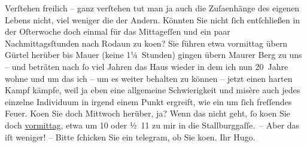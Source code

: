 \begin{ledgroupsized}[t]{13cm}
           \pstart
           Verſtehen freilich – ganz verſtehen tut man ja auch die Zuſa{\geminationm}enhänge des eigenen Lebens nicht, viel weniger die der
               Andern.\pend
           \pstart
           Könnten Sie nicht ſich entſchließen in der Oſterwoche doch einmal für
               das Mittageſſen und ein paar Nachmittagsſtunden nach Rodaun zu ko{\geminationm}en? {\pb}Sie führen etwa vormittag übern
                  Gürtel herüber bis Mauer (keine 1¼ Stunden) gingen übern Maurer Berg zu uns – und beträten nach ſo viel Jahren das Haus wieder in dem ich nun
               20 Jahre wohne und um das ich – um es weiter behalten zu können – jetzt einen harten
               Kampf kämpfe, weil ja eben eine {\pb}allgemeine Schwierigkeit und misère auch jedes einzelne Individuum in irgend einem
               Punkt ergreift, wie ein um ſich freſſendes Feuer.\pend
           \pstart
           Ko{\geminationm}en Sie doch Mittwoch herüber, ja?\pend
           \pstart
           Wenn das nicht geht, ſo ko{\geminationm}en Sie doch \label{K_L02364-1v}\label{K_L02364-1h}{ }\uline{vormittag}, etwa um 10 oder ½ 11 zu mir in die Stallburggaſſe. – Aber das iſt weniger! – Bitte
               ſchicken Sie ein telegram, ob Sie ko{\geminationm}en.\pend
           \pstart Ihr \spacefill\mbox{Hugo.}\pend{}
         
         \endnumbering{}\end{ledgroupsized}  \newcommand{\dateiname}{L02364}\newcommand{\titel}{Hugo Hofmannsthal an Arthur Schnitzler, [19. 3. 1921]}\newcommand{\editorInnen}{Martin Anton Müller und Gerd-Hermann Susen}
      